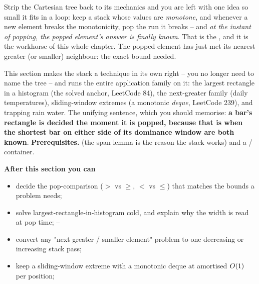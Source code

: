 \begin{topicintro}
Strip the Cartesian tree back to its mechanics and you are left with one idea so small it fits in a
 loop: keep a stack whose values are \emph{monotone}, and whenever a new element breaks the
monotonicity, pop the run it breaks -- and \emph{at the instant of popping, the popped element's answer
is finally known}. That is the , and it is the workhorse of this whole chapter.
The popped element has just met its nearest greater (or smaller) neighbour: the exact bound
 needed.

This section makes the stack a technique in its own right -- you no longer need to name the tree -- and
runs the entire application family on it: the largest rectangle in a histogram (the solved anchor,
LeetCode 84), the next-greater family (daily temperatures), sliding-window extremes (a monotonic
\emph{deque}, LeetCode 239), and trapping rain water. The unifying sentence, which you should memorise:
\textbf{a bar's rectangle is decided the moment it is popped, because that is when the shortest bar on
either side of its dominance window are both known}.
\textbf{Prerequisites.}  (the span lemma is the reason the stack works) and a
/ container.

\textbf{After this section you can}
\begin{itemize}[nosep]
  \item decide the pop-comparison ($>$ vs $\ge$, $<$ vs $\le$) that matches the bounds a problem needs; \hfill{}
  \item solve largest-rectangle-in-histogram cold, and explain why the width is read at pop time; \hfill{}--
  \item convert any "next greater / smaller element" problem to one decreasing or increasing stack pass; \hfill{}
  \item keep a sliding-window extreme with a monotonic deque at amortised $O(1)$ per position; \hfill{}
\end{itemize}
\end{topicintro}

